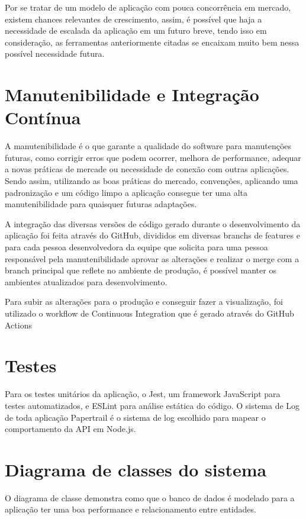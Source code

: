 Por se tratar de um modelo de aplicação com pouca concorrência em mercado, existem chances relevantes de crescimento, assim, é possível que haja a necessidade de escalada da aplicação em um futuro breve, tendo isso em consideração, as ferramentas anteriormente citadas se encaixam muito bem nessa possível necessidade futura. 



\section{Manutenibilidade e Integração Contínua}
A manutenibilidade é o que garante a qualidade do software para manutenções futuras, como corrigir erros que podem ocorrer, melhora de performance, adequar a novas práticas de mercade ou necessidade de conexão com outras aplicações. Sendo assim, utilizando as boas práticas do mercado, convenções, aplicando uma padronização e um código limpo a aplicação consegue ter uma alta manutenibilidade para quaisquer futuras adaptações.  

A integração das diversas versões de código gerado durante o desenvolvimento da aplicação foi feita através do GitHub, divididos em diversas branchs de features e para cada pessoa desenvolvedora da equipe que solicita para uma pessoa responsável pela manutenibilidade aprovar as alterações e realizar o merge com a branch principal que reflete no ambiente de produção, é possível manter os ambientes atualizados para desenvolvimento.

Para subir as alterações para o produção e conseguir fazer a visualização, foi utilizado o workflow de Continuous Integration que é gerado através do GitHub Actions



\section{Testes}

Para os testes unitários da aplicação, o Jest, um framework JavaScript para testes automatizados, e ESLint para análise estática do código.
O sistema de Log de toda aplicação Papertrail é o sistema de log escolhido para mapear o comportamento da API em Node.js.

\section{Diagrama de classes do sistema}

O diagrama de classe demonstra como que o banco de dados é modelado para a aplicação ter uma boa performance e relacionamento entre entidades. 

